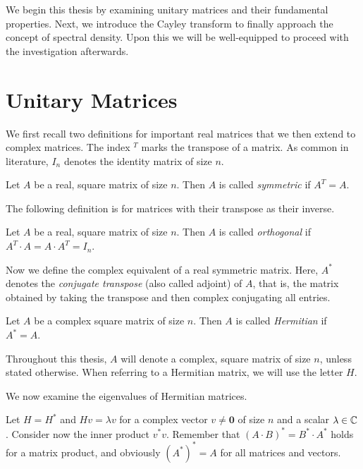 We begin this thesis by examining unitary matrices and their fundamental properties.
Next, we introduce the Cayley transform to finally approach the concept of spectral density.
Upon this we will be well-equipped to proceed with the investigation afterwards.

\section{Unitary Matrices}

We first recall two definitions for important real matrices that we then extend to complex matrices.
The index $^T$ marks the transpose of a matrix.
As common in literature, $I_n$ denotes the identity matrix of size $n$.

\begin{definition}
    Let $A$ be a real, square matrix of size $n$.
    Then $A$ is called \emph{symmetric} if $A^T = A$.
\end{definition}

The following definition is for matrices with their transpose as their inverse.

\begin{definition}
    Let $A$ be a real, square matrix of size $n$.
    Then $A$ is called \emph{orthogonal} if $A^T \cdot A = A \cdot A^T = I_n$.
\end{definition}


Now we define the complex equivalent of a real symmetric matrix.
Here, $A^*$ denotes the \emph{conjugate transpose} (also called adjoint) of $A$, that is,
the matrix obtained by taking the transpose and then complex conjugating all entries.

\begin{definition}
    Let $A$ be a complex square matrix of size $n$.
    Then $A$ is called \emph{Hermitian} if $A^* = A$.
\end{definition}

Throughout this thesis, $A$ will denote a complex, square matrix of size $n$, unless stated otherwise.
When referring to a Hermitian matrix, we will use the letter $H$.

We now examine the eigenvalues of Hermitian matrices.

Let $H = H^*$ and $H v = \lambda v$ for a complex vector $v \neq \mathbf{0}$ of size $n$ and a scalar $\lambda \in \mathbb{C}$.
Consider now the inner product $ v^* v$.
Remember that $(A \cdot B)^* = B^* \cdot A^*$ holds for a matrix product,
and obviously ${(A^*)^*} = A$ for all matrices and vectors.

